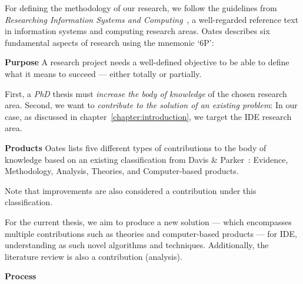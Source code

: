
For defining the methodology of our research, we follow the guidelines
from \emph{Researching Information Systems and Computing}~\cite{Oates2006},
a well-regarded reference text in information systems and computing research areas.
Oates describes six fundamental aspects of research using the mnemonic `6P':


\textbf{Purpose}
\label{method:purpose}
A research project needs a well-defined objective to be able
to define what it means to succeed --- either totally or partially.

First, a \emph{PhD} thesis must \emph{increase the body of knowledge}
of the chosen research area. Second, we want to \emph{contribute to the solution
of an existing problem}:
In our case, as discussed in chapter~\ref{chapter:introduction}, we target the
\gls{IDE} research area.

\textbf{Products}
\label{method:products}
Oates lists five different types of contributions to the body of knowledge based on
an existing classification from Davis \& Parker~\cite{Oates2006,Davis1997}:
Evidence, Methodology, Analysis, Theories, and Computer-based products.

Note that improvements are also considered a contribution under this classification.

For the current thesis, we aim to produce a new solution --- which encompasses
multiple contributions such as theories and computer-based products --- for \gls{IDE}, understanding as such novel
algorithms and techniques.
Additionally, the literature review is also a contribution (analysis).

\textbf{Process}
\label{method:process}

